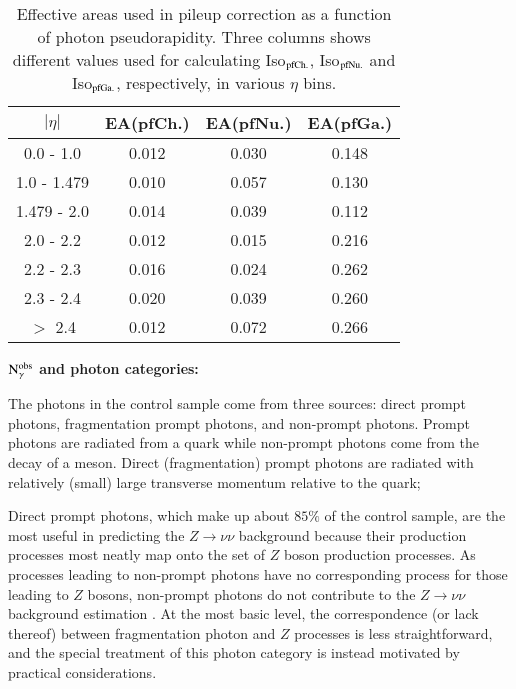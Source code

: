 \begin{table}[h]
\begin{center}
\caption{Effective areas used in pileup correction as a function of photon pseudorapidity. Three columns shows different values used for calculating Iso$_{\rm pfCh.}$, Iso$_{\rm pfNu.}$ and Iso$_{\rm pfGa.}$, respectively, in various $\eta$ bins. }
\begin{tabular}{|c|c|c|c|}
\hline 
$|\eta|$  & EA(pfCh.) & EA(pfNu.) & EA(pfGa.) \\ \hline 
0.0 - 1.0 & 0.012 & 0.030 & 0.148 \\ 
1.0 - 1.479 & 0.010 & 0.057 & 0.130 \\
1.479 - 2.0 & 0.014 & 0.039 & 0.112 \\
2.0 - 2.2 & 0.012 & 0.015 & 0.216 \\
2.2 - 2.3 & 0.016 & 0.024 & 0.262 \\
2.3 - 2.4 & 0.020 & 0.039 & 0.260 \\
$>$ 2.4 & 0.012 & 0.072 & 0.266 \\
\hline 
\end{tabular}
\label{tab:effarea}
\end{center}
\end{table}


{\bf $\rm N_{\gamma}^{\rm obs}$ and photon categories: }


The photons in the control sample come from three sources: direct prompt photons, fragmentation 
prompt photons, and non-prompt photons.  Prompt photons are radiated from a quark while non-prompt photons come 
from the decay of a meson. Direct (fragmentation) prompt photons are radiated with relatively (small) large transverse momentum 
relative to the quark;

Direct prompt photons, which make up about $85\%$ of the control sample, are the most useful in predicting 
the $Z\to\nu\nu$ background because their production processes most neatly map onto the set of $Z$ boson 
production processes. As processes leading to non-prompt photons have no corresponding process for 
 those leading to $Z$ bosons, non-prompt photons do not contribute to the $Z\to\nu\nu$ background estimation 
.  At the most basic level, the correspondence (or lack thereof) between fragmentation photon 
 and $Z$ processes is less straightforward, and the special treatment of this photon category 
is instead motivated by practical considerations. %

